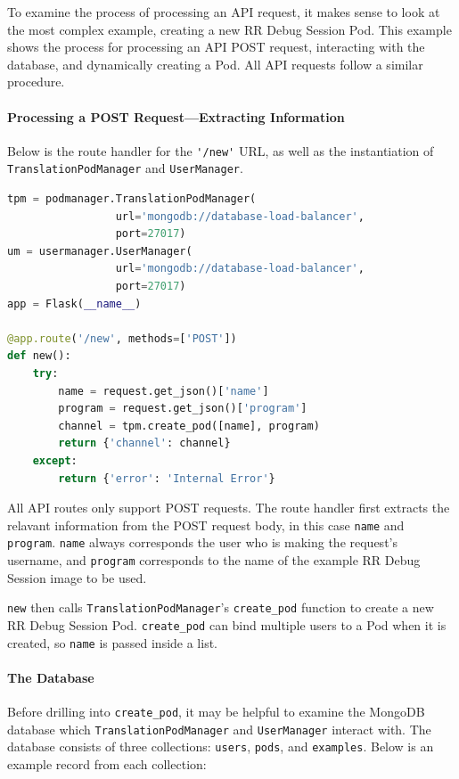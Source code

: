 \documentclass[12pt]{article}
\begin{document}
To examine the process of processing an API request, it makes sense to
look at the most complex example, creating a new RR Debug Session Pod.
This example shows the process for processing an API POST request,
interacting with the database, and dynamically creating a Pod.  All
API requests follow a similar procedure.

\paragraph{Processing a POST Request---Extracting Information}

Below is the route handler for the \lstinline{'/new'} URL, as well as
the instantiation of \lstinline{TranslationPodManager} and
\lstinline{UserManager}.\\

\begin{lstlisting}[language=Python,basicstyle=\linespread{0.5}\ttfamily\small,caption={API Server New RR Debug Session Event Handler},captionpos=b]
tpm = podmanager.TranslationPodManager(
                 url='mongodb://database-load-balancer',
                 port=27017)
um = usermanager.UserManager(
                 url='mongodb://database-load-balancer',
                 port=27017)
app = Flask(__name__)

@app.route('/new', methods=['POST'])
def new():
    try:
        name = request.get_json()['name']
        program = request.get_json()['program']
        channel = tpm.create_pod([name], program)
        return {'channel': channel}
    except:
        return {'error': 'Internal Error'}
\end{lstlisting}

All API routes only support POST requests.  The route handler first
extracts the relavant information from the POST request body, in this
case \lstinline{name} and \lstinline{program}.  \lstinline{name}
always corresponds the user who is making the request's username, and
\lstinline{program} corresponds to the name of the example RR Debug
Session image to be used.
\par

\lstinline{new} then calls \lstinline{TranslationPodManager}'s
\lstinline{create_pod} function to create a new RR Debug Session Pod.
\lstinline{create_pod} can bind multiple users to a Pod when it is
created, so \lstinline{name} is passed inside a list.

\paragraph{The Database} Before drilling into \lstinline{create_pod},
it may be helpful to examine the MongoDB database which
\lstinline{TranslationPodManager} and \lstinline{UserManager} interact
with.  The database consists of three collections: \lstinline{users},
\lstinline{pods}, and \lstinline{examples}.  Below is an example
record from each collection:
\end{document}
